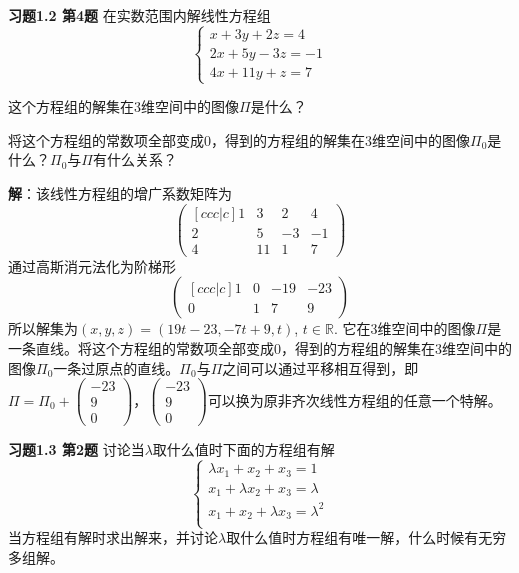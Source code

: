 \newpageorvspace

{\bf 习题1.2 第4题} 在实数范围内解线性方程组
$$\begin{cases}
x + 3y + 2z = 4 \\
2x + 5y -3z = -1 \\
4x + 11y + z = 7
\end{cases}$$

这个方程组的解集在3维空间中的图像$\Pi$是什么？

将这个方程组的常数项全部变成0，得到的方程组的解集在3维空间中的图像$\Pi_0$是什么？$\Pi_0$与$\Pi$有什么关系？

{\bf 解}：该线性方程组的增广系数矩阵为
$$\begin{pmatrix}[ccc|c]
  1 & 3 & 2 & 4\\
  2 & 5 & -3 & -1 \\
  4 & 11 & 1 & 7
\end{pmatrix}$$
通过高斯消元法化为阶梯形
$$\begin{pmatrix}[ccc|c]
  1 & 0 & -19 & -23\\
  0 & 1 & 7 & 9
\end{pmatrix}$$
所以解集为$(x,y,z) = (19t-23,-7t+9,t)$, $t\in\mathbb{R}$. 它在3维空间中的图像$\Pi$是一条直线。将这个方程组的常数项全部变成0，得到的方程组的解集在3维空间中的图像$\Pi_0$一条过原点的直线。$\Pi_0$与$\Pi$之间可以通过平移相互得到，即$\Pi = \Pi_0 + \begin{pmatrix} -23 \\ 9 \\ 0 \end{pmatrix}$，$\begin{pmatrix} -23 \\ 9 \\ 0 \end{pmatrix}$可以换为原非齐次线性方程组的任意一个特解。

\newpageorvspace

{\bf 习题1.3 第2题} 讨论当$\lambda$取什么值时下面的方程组有解
$$\begin{cases}
\lambda x_1 + x_2 + x_3 = 1 \\
x_1 + \lambda x_2 + x_3 = \lambda \\
x_1 + x_2 + \lambda x_3 = \lambda^2 \\
\end{cases}$$
当方程组有解时求出解来，并讨论$\lambda$取什么值时方程组有唯一解，什么时候有无穷多组解。

